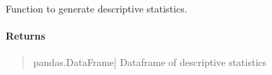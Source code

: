 \documentclass[letterpaper,10pt,english,openany,oneside]{sphinxmanual}
\begin{document}
\begin{fulllineitems}
\label{\detokenize{api_reference/generated/QuadratiK.poisson_kernel_test.PoissonKernelTest:QuadratiK.poisson_kernel_test.PoissonKernelTest.stats}}
\pysigstartsignatures
{}
\pysigstopsignatures
\sphinxAtStartPar
Function to generate descriptive statistics.


\paragraph{Returns}
\label{\detokenize{api_reference/generated/QuadratiK.poisson_kernel_test.PoissonKernelTest:returns}}\begin{quote}
\begin{description}
\sphinxlineitem{summary\_stats\_df}{[}pandas.DataFrame{]}
\sphinxAtStartPar
Dataframe of descriptive statistics

\end{description}
\end{quote}

\end{fulllineitems}

\end{document}
